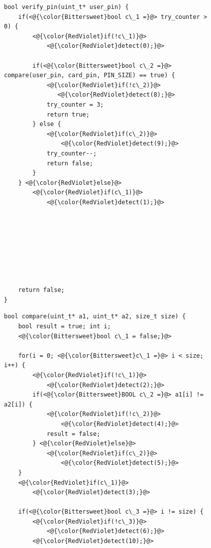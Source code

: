         \begin{figure}[hpt]\centering
        \begin{multicols}{2}
        \begin{lstlisting}
bool verify_pin(uint_t* user_pin) {
    if(<@{\color{Bittersweet}bool c\_1 =}@> try_counter > 0) {
        <@{\color{RedViolet}if(!c\_1)}@>
            <@{\color{RedViolet}detect(0);}@>
            
        if(<@{\color{Bittersweet}bool c\_2 =}@> compare(user_pin, card_pin, PIN_SIZE) == true) {
            <@{\color{RedViolet}if(!c\_2)}@>
               <@{\color{RedViolet}detect(8);}@>
            try_counter = 3;
            return true;
        } else {
            <@{\color{RedViolet}if(c\_2)}@>
                <@{\color{RedViolet}detect(9);}@>
            try_counter--;
            return false;
        }
    } <@{\color{RedViolet}else}@>
        <@{\color{RedViolet}if(c\_1)}@>
            <@{\color{RedViolet}detect(1);}@>







    
    return false;
}
\end{lstlisting}  
\columnbreak

\begin{lstlisting}[label=lst:ch6:vp4-compare]
bool compare(uint_t* a1, uint_t* a2, size_t size) {
    bool result = true; int i;
    <@{\color{Bittersweet}bool c\_1 = false;}@>
    
    for(i = 0; <@{\color{Bittersweet}c\_1 =}@> i < size; i++) { 
        <@{\color{RedViolet}if(!c\_1)}@>
            <@{\color{RedViolet}detect(2);}@>
        if(<@{\color{Bittersweet}BOOL c\_2 =}@> a1[i] != a2[i]) {
            <@{\color{RedViolet}if(!c\_2)}@>
                <@{\color{RedViolet}detect(4);}@> 
            result = false; 
        } <@{\color{RedViolet}else}@>
            <@{\color{RedViolet}if(c\_2)}@>
                <@{\color{RedViolet}detect(5);}@> 
    }
    <@{\color{RedViolet}if(c\_1)}@>
        <@{\color{RedViolet}detect(3);}@>

    if(<@{\color{Bittersweet}bool c\_3 =}@> i != size) {
        <@{\color{RedViolet}if(!c\_3)}@>
            <@{\color{RedViolet}detect(6);}@>
        <@{\color{RedViolet}detect(10);}@>
    

\end{lstlisting}
\end{multicols}
\end{figure}
